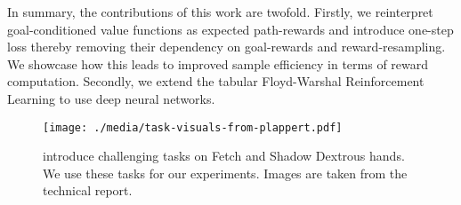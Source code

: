 In summary, the  contributions of this work are twofold. Firstly, we
reinterpret goal-conditioned value functions as expected path-rewards
and introduce one-step loss thereby removing their dependency on
goal-rewards and reward-resampling. We showcase how this leads to improved sample efficiency in  terms
of reward computation.
Secondly, we extend the tabular Floyd-Warshal Reinforcement Learning to
use deep neural networks.




%
\begin{figure}%
  \texttt{[image: ./media/task-visuals-from-plappert.pdf]}%
  \label{fig:envs}%
  \caption{\citet{plappert201802multigoalrl} introduce challenging tasks on
Fetch and Shadow Dextrous hands. We use these tasks for our experiments.
    Images are taken from the technical report.}%
\end{figure}%
% 
